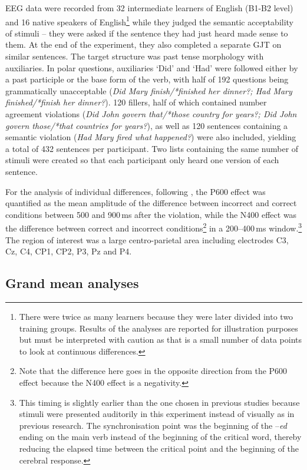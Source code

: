 \documentclass[output=paper,colorlinks,citecolor=brown,modfonts,nonflat]{../langscibook}
\begin{document}
EEG data were recorded from 32 intermediate  learners of English (B1-B2 level) and 16 native speakers of English\footnote{{There were twice as many learners because they were later divided into two training groups. Results of the analyses are reported for illustration purposes but must be interpreted with caution as that is a small number of data points to look at continuous differences.}} while they judged the semantic acceptability of stimuli – they were asked if the sentence they had just heard made sense to them. At the end of the experiment, they also completed a separate GJT on similar sentences. The target structure was past tense morphology with auxiliaries. In polar questions, auxiliaries ‘Did’ and ‘Had’ were followed either by a past participle or the base form of the verb, with half of 192 questions being grammatically unacceptable (\textit{Did Mary finish/*finished her dinner?; Had Mary finished/*finish her dinner?}). 120 fillers, half of which contained number agreement violations (\textit{Did John govern that/*those country for years?; Did John govern those/*that countries for years?}), as well as 120 sentences containing a semantic violation (\textit{Had Mary fired what happened?}) were also included, yielding a total of 432 sentences per participant. Two lists containing the same number of stimuli were created so that each participant only heard one version of each sentence.

For the analysis of individual differences, following \citet{TannerEtAl2014}, the P600 effect was quantified as the mean amplitude of the difference between incorrect and correct conditions between 500 and 900\,ms after the violation, while the N400 effect was the difference between correct and incorrect conditions\footnote{{Note that the difference here goes in the opposite direction from the P600 effect because the N400 effect is a negativity.}} in a 200--400\,ms window.\footnote{{This timing is slightly earlier than the one chosen in previous studies because stimuli were presented auditorily in this experiment instead of visually as in previous research. The synchronisation point was the beginning of the –}{\textit{ed}} {ending on the main verb instead of the beginning of the critical word, thereby reducing the elapsed time between the critical point and the beginning of the cerebral response.}} The region of interest was a large centro-parietal area including electrodes C3, Cz, C4, CP1, CP2, P3, Pz and P4.

\subsection{Grand mean analyses}
\end{document}
